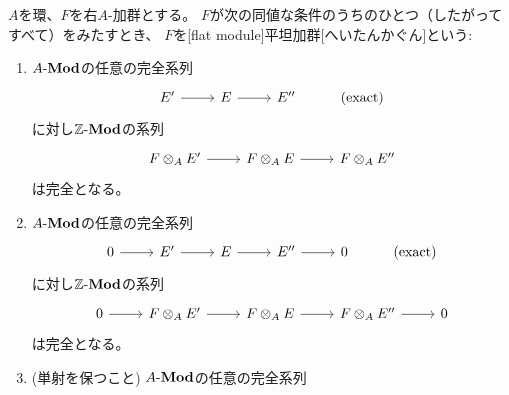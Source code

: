 \documentclass[report]{jlreq}
\begin{document}
\begin{definition}[平坦加群]
    $A$を環、$F$を右$A$-加群とする。
    $F$が次の同値な条件のうちのひとつ（したがってすべて）をみたすとき、
    $F$を[flat module]{平坦加群}[へいたんかぐん]という:
    \begin{enumerate}
        \item $A\text{-}\mathbf{Mod}$の任意の完全系列
            \begin{equation}
                \begin{tikzcd}
                    E' \ar{r}
                        & E \ar{r}
                        & E''
                        & (\text{exact})
                \end{tikzcd}
            \end{equation}
            に対し$\mathbb{Z}\text{-}\mathbf{Mod}$の系列
            \begin{equation}
                \begin{tikzcd}
                    F \otimes_A E' \ar{r}
                        & F \otimes_A E \ar{r}
                        & F \otimes_A E''
                \end{tikzcd}
            \end{equation}
            は完全となる。
        \item $A\text{-}\mathbf{Mod}$の任意の完全系列
            \begin{equation}
                \begin{tikzcd}
                    0 \ar{r}
                        & E' \ar{r}
                        & E \ar{r}
                        & E'' \ar{r}
                        & 0
                        & (\text{exact})
                \end{tikzcd}
            \end{equation}
            に対し$\mathbb{Z}\text{-}\mathbf{Mod}$の系列
            \begin{equation}
                \begin{tikzcd}
                    0 \ar{r}
                        & F \otimes_A E' \ar{r}
                        & F \otimes_A E \ar{r}
                        & F \otimes_A E'' \ar{r}
                        & 0
                \end{tikzcd}
            \end{equation}
            は完全となる。
        \item (単射を保つこと) $A\text{-}\mathbf{Mod}$の任意の完全系列
            \begin{equation}
                \begin{tikzcd}

\end{tikzcd}
\end{equation}
\end{enumerate}
\end{definition}
\end{document}
